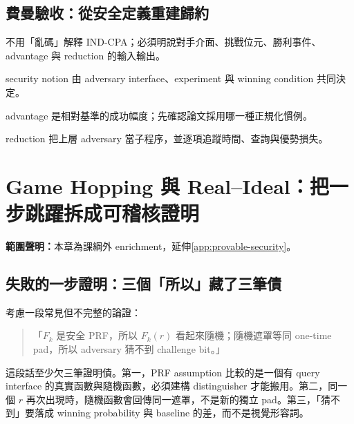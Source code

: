 \documentclass[11pt,a4paper,oneside,openany]{book}
\begin{document}
\section{費曼驗收：從安全定義重建歸約}
\begin{feynmancheck}
不用「亂碼」解釋 IND-CPA；必須明說對手介面、挑戰位元、勝利事件、advantage 與 reduction 的輸入輸出。
\end{feynmancheck}
\begin{chapterrecap}
\item security notion 由 adversary interface、experiment 與 winning condition 共同決定。
\item advantage 是相對基準的成功幅度；先確認論文採用哪一種正規化慣例。
\item reduction 把上層 adversary 當子程序，並逐項追蹤時間、查詢與優勢損失。
\end{chapterrecap}

\chapter{Game Hopping 與 Real--Ideal：把一步跳躍拆成可稽核證明}
\label{app:games}
\noindent\textbf{範圍聲明：}本章為課綱外 enrichment，延伸\cref{app:provable-security}。

\section{失敗的一步證明：三個「所以」藏了三筆債}
考慮一段常見但不完整的論證：
\begin{quote}
「$F_k$ 是安全 PRF，所以 $F_k(r)$ 看起來隨機；隨機遮罩等同 one-time pad，所以 adversary 猜不到 challenge bit。」
\end{quote}
這段話至少欠三筆證明債。第一，PRF assumption 比較的是一個有 query interface 的真實函數與隨機函數，必須建構 distinguisher 才能搬用。第二，同一個 $r$ 再次出現時，隨機函數會回傳同一遮罩，不是新的獨立 pad。第三，「猜不到」要落成 winning probability 與 baseline 的差，而不是視覺形容詞。
\end{document}
